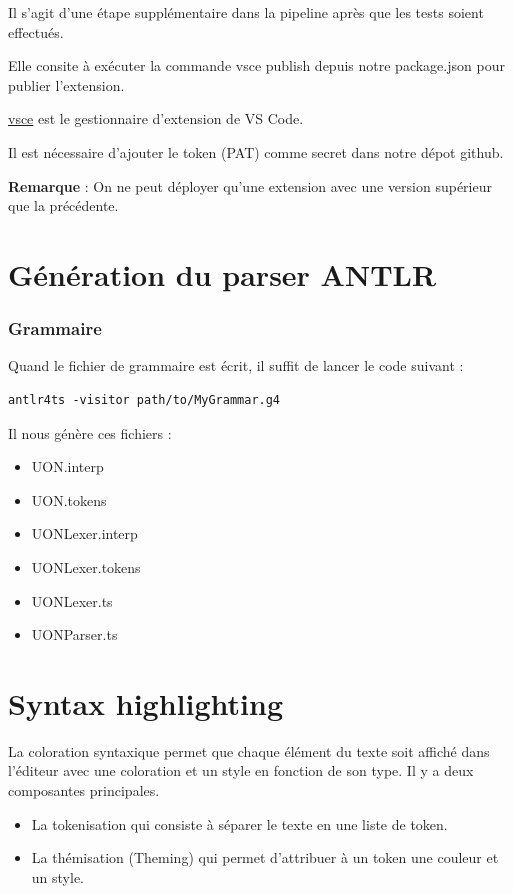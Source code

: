 \documentclass[
    iict, %
    il, %
]{heig-tb}
\begin{document}
Il s'agit d'une étape supplémentaire dans la pipeline après que les tests soient effectués.

Elle consite à exécuter la commande vsce publish depuis notre package.json pour publier l'extension.

\href{https://www.npmjs.com/package/vsce}{vsce} est le gestionnaire d'extension de VS Code.

Il est nécessaire d'ajouter le token (PAT) comme secret dans notre dépot github. %

\textbf{Remarque } : On ne peut déployer qu'une extension avec une version supérieur que la précédente. %




\section{Génération du parser ANTLR}
\subsubsection{Grammaire}

Quand le fichier de grammaire est écrit, il suffit de lancer le code suivant :

\begin{lstlisting}[frame=single]
    antlr4ts -visitor path/to/MyGrammar.g4
\end{lstlisting}

Il nous génère ces fichiers :
\begin{itemize}
    \item UON.interp
    \item UON.tokens
    \item UONLexer.interp
    \item UONLexer.tokens
    \item UONLexer.ts
    \item UONParser.ts
\end{itemize}

\section{Syntax highlighting}

La coloration syntaxique permet que chaque élément du texte soit affiché dans l'éditeur avec une coloration et un style en fonction de son type.
Il y a deux composantes principales.
\begin{itemize}
    \item La tokenisation qui consiste à séparer le texte en une liste de token.
    \item La thémisation (Theming) qui permet d'attribuer à un token une couleur et un style.
\end{itemize}
\end{document}
